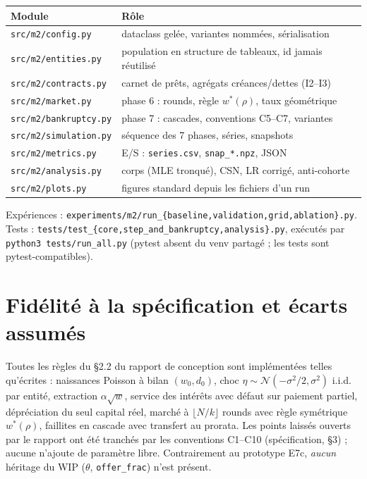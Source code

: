 \documentclass[11pt,a4paper]{article}
\newcommand{\code}[1]{\texttt{#1}}
\begin{document}
\begin{center}
\begin{tabular}{ll}
\toprule
Module & Rôle \\
\midrule
\code{src/m2/config.py} & dataclass gelée, variantes nommées, sérialisation \\
\code{src/m2/entities.py} & population en structure de tableaux, id jamais réutilisé \\
\code{src/m2/contracts.py} & carnet de prêts, agrégats créances/dettes (I2--I3) \\
\code{src/m2/market.py} & phase 6 : rounds, règle $w^*(\rho)$, taux géométrique \\
\code{src/m2/bankruptcy.py} & phase 7 : cascades, conventions C5--C7, variantes \\
\code{src/m2/simulation.py} & séquence des 7 phases, séries, snapshots \\
\code{src/m2/metrics.py} & E/S : \code{series.csv}, \code{snap\_*.npz}, JSON \\
\code{src/m2/analysis.py} & corps (MLE tronqué), CSN, LR corrigé, anti-cohorte \\
\code{src/m2/plots.py} & figures standard depuis les fichiers d'un run \\
\bottomrule
\end{tabular}
\end{center}

Expériences : \code{experiments/m2/run\_\{baseline,validation,grid,ablation\}.py}.
Tests : \code{tests/test\_\{core,step\_and\_bankruptcy,analysis\}.py}, exécutés
par \code{python3 tests/run\_all.py} (pytest absent du venv partagé ;
les tests sont pytest-compatibles).

\section{Fidélité à la spécification et écarts assumés}
Toutes les règles du §2.2 du rapport de conception sont implémentées telles
qu'écrites : naissances Poisson à bilan $(w_0, d_0)$, choc
$\eta \sim \mathcal N(-\sigma^2/2, \sigma^2)$ i.i.d. par entité, extraction
$\alpha\sqrt w$, service des intérêts avec défaut sur paiement partiel,
dépréciation du seul capital réel, marché à $\lfloor N/k\rfloor$ rounds avec
règle symétrique $w^*(\rho)$, faillites en cascade avec transfert au prorata.
Les points laissés ouverts par le rapport ont été tranchés par les
conventions C1--C10 (spécification, §3) ; aucune n'ajoute de paramètre libre.
Contrairement au prototype E7c, \emph{aucun} héritage du WIP
($\theta$, \code{offer\_frac}) n'est présent.
\end{document}
